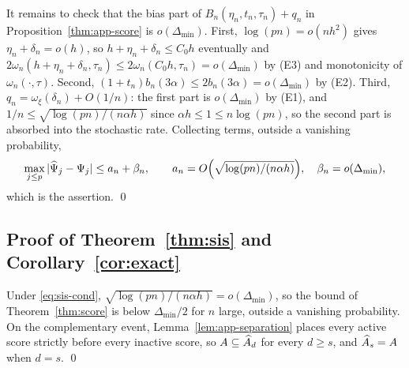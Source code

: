 It remains to check that the bias part of $B_n(\eta_n,t_n,\tau_n)+q_n$ in
Proposition~\ref{thm:app-score} is
$o(\Delta_{\min})$.  First, $\log(pn)=o(nh^2)$ gives
$\eta_n+\delta_n=o(h)$, so $h+\eta_n+\delta_n\le C_0h$ eventually and
$2\omega_n(h+\eta_n+\delta_n,\tau_n)\le2\omega_n(C_0h,\tau_n)
=o(\Delta_{\min})$ by (E3) and monotonicity of
$\omega_n(\cdot,\tau)$.  Second,
$(1+t_n)b_n(3\alpha)\le2b_n(3\alpha)=o(\Delta_{\min})$ by (E2).  Third,
$q_n=\omega_\xi(\delta_n)+O(1/n)$: the first part is
$o(\Delta_{\min})$ by (E1), and
$1/n\le\sqrt{\log(pn)/(n\alpha h)}$ since $\alpha h\le1\le n\log(pn)$, so
the second part is absorbed into the stochastic rate.  Collecting terms,
outside a vanishing probability,
\[
 \max_{j\le p}|\widehat\Psi_j-\Psi_j|
 \le a_n+\beta_n,\qquad
 a_n=O\Bigl(\sqrt{\log(pn)/(n\alpha h)}\Bigr),\quad
 \beta_n=o(\Delta_{\min}),
\]
which is the assertion.  \qed

\subsection{Proof of Theorem~\ref{thm:sis} and
Corollary~\ref{cor:exact}}

Under \eqref{eq:sis-cond},
$\sqrt{\log(pn)/(n\alpha h)}=o(\Delta_{\min})$, so the bound of
Theorem~\ref{thm:score} is below $\Delta_{\min}/2$ for $n$ large,
outside a vanishing probability.  On the complementary event,
Lemma~\ref{lem:app-separation} places every active score strictly before
every inactive score, so $A\subseteq\widehat{A}_d$ for every $d\ge s$,
and $\widehat{A}_s=A$ when $d=s$.  \qed
